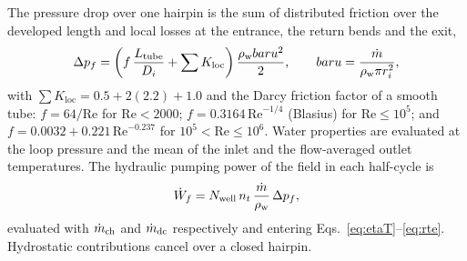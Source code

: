 The pressure drop over one hairpin is the sum of distributed friction over the
developed length and local losses at the entrance, the return bends and the
exit,
\begin{equation}
  \Delta p_f=\left(f\,\frac{L_{\mathrm{tube}}}{D_i}+\sum K_\mathrm{loc}\right)
            \frac{\rho_\mathrm{w}bar u^{2}}{2},
  \qquad
  bar u=\frac{\dot m}{\rho_\mathrm{w}\pi r_i^{2}},
  \label{eq:dp}
\end{equation}
with $\sum K_\mathrm{loc}=0.5+2(2.2)+1.0$  and the Darcy friction factor of a smooth tube:
$f=64/\mathrm{Re}$ for $\mathrm{Re}<2000$; $f=0.3164\,\mathrm{Re}^{-1/4}$
(Blasius) for $\mathrm{Re}\le10^{5}$; and
$f=0.0032+0.221\,\mathrm{Re}^{-0.237}$ for $10^{5}<\mathrm{Re}\le10^{6}$.
 Water
properties are evaluated at the loop pressure and the mean of the inlet and
the flow-averaged outlet temperatures. The hydraulic pumping power of the
field in each half-cycle is
\begin{equation}
  \dot W_{f}=N_{\mathrm{well}}\,n_t\,\frac{\dot m}{\rho_\mathrm{w}}\,\Delta p_f ,
  \label{eq:Wf}
\end{equation}
evaluated with $\dot m_\mathrm{ch}$ and $\dot m_\mathrm{dc}$ respectively and
entering Eqs.~\eqref{eq:etaT}--\eqref{eq:rte}. Hydrostatic contributions
cancel over a closed hairpin.

